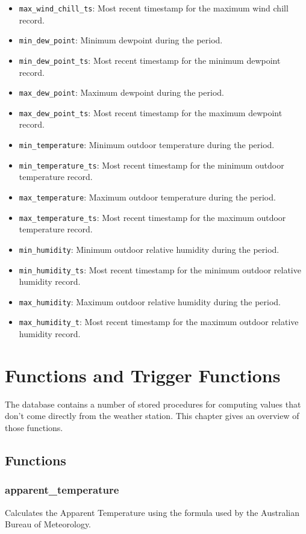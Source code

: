 \documentclass[a4paper,10pt]{book}
\begin{document}
\begin{itemize}
\item \verb|max_wind_chill_ts|: Most recent timestamp for the maximum wind chill record.
\item \verb|min_dew_point|: Minimum dewpoint during the period.
\item \verb|min_dew_point_ts|: Most recent timestamp for the minimum dewpoint record.
\item \verb|max_dew_point|: Maximum dewpoint during the period.
\item \verb|max_dew_point_ts|: Most recent timestamp for the maximum dewpoint record.
\item \verb|min_temperature|: Minimum outdoor temperature during the period.
\item \verb|min_temperature_ts|: Most recent timestamp for the minimum outdoor temperature record.
\item \verb|max_temperature|: Maximum outdoor temperature during the period.
\item \verb|max_temperature_ts|: Most recent timestamp for the maximum outdoor temperature record.
\item \verb|min_humidity|: Minimum outdoor relative humidity during the period.
\item \verb|min_humidity_ts|: Most recent timestamp for the minimum outdoor relative humidity record.
\item \verb|max_humidity|: Maximum outdoor relative humidity during the period.
\item \verb|max_humidity_t|: Most recent timestamp for the maximum outdoor relative humidity record.
\end{itemize}

\chapter{Functions and Trigger Functions}
\label{cha_functions}

The database contains a number of stored procedures for computing values that don't come directly from the weather station. This chapter gives an overview of those functions.

\section{Functions}
\label{functions}

\subsection{apparent\_temperature}
\label{apparent_temperature}
Calculates the Apparent Temperature using the formula used by the Australian Bureau of Meteorology.
\end{document}
